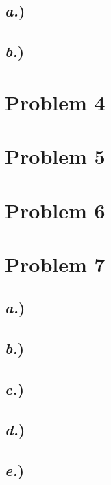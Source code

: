 \documentclass{article}
\begin{document}
\subsection*{\textit{a.})}
\subsection*{\textit{b.})}



\section*{Problem 4}




\section*{Problem 5}






\section*{Problem 6}






\section*{Problem 7}


\subsection*{\textit{a.})}
\subsection*{\textit{b.})}
\subsection*{\textit{c.})}
\subsection*{\textit{d.})}
\subsection*{\textit{e.})}



\end{document}
